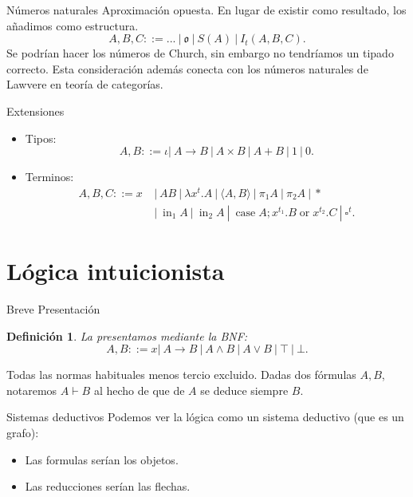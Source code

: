 \documentclass[usenames,dvipsnames]{beamer}
\newcommand{\oo}{\operatorname{ or }}
\newcommand{\ccase}{\operatorname{case}}
\newcommand{\iin}{\operatorname{in}}
\newtheorem{definicion}{Definición}
\begin{document}
\begin{frame}{Números naturales}
  Aproximación opuesta. En lugar de existir como resultado, los añadimos como estructura.
      $$A,B, C ::= ...\ |\ \mathfrak{o}\ |\ S(A)\ |\ I_t(A,B,C).$$
Se podrían hacer los números de Church, sin embargo no tendríamos un tipado correcto. Esta consideración además conecta con los números naturales de Lawvere en teoría de categorías.

\end{frame}




\begin{frame}{Extensiones}
  \begin{itemize}
  \item Tipos:
    $$A,B ::= \iota |\ A\to B\ |\ A \times B \ |\ A + B  \ |\ 1\ |\ 0.$$
  \item Terminos:
    \begin{align*}
      A,B, C ::= x\ &|\ AB\ |\ \lambda x^t.A \ |\ \langle A,B \rangle\ |\ \pi_1A\ |\ \pi_2A\ |\ * \\
                    &|\ \iin_1 A\ |\ \iin_2 A \ |\ \ccase A ; x^{t_1}.B\oo x^{t_2}.C \ |\ \square^t.
    \end{align*}
  \end{itemize}
\end{frame}
\section{Lógica intuicionista}

\begin{frame}{Breve Presentación}
  \begin{definicion}
    La presentamos mediante la BNF:
  $$A,B ::= x |\ A\to B\ |\ A \land B \ |\ A \lor B \ |\ \top \ |\ \bot .$$
\end{definicion}
Todas las normas habituales menos tercio excluido. Dadas dos fórmulas $A,B$, notaremos $A\vdash B$ al hecho de que de $A$ se deduce siempre $B$.
\end{frame}

\begin{frame}{Sistemas deductivos}
  Podemos ver la lógica como un sistema deductivo (que es un grafo):
  \begin{itemize}
  \item Las formulas serían los objetos.
  \item Las reducciones serían las flechas.
  \end{itemize}
\end{frame}
\end{document}
